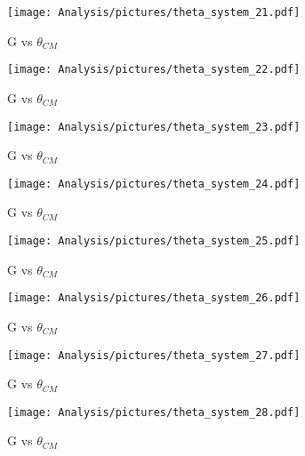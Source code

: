 \begin{figure}[htb]
  \begin{center}
    \texttt{[image: Analysis/pictures/theta\_system\_21.pdf]} \\
    \caption{G vs $\theta_{CM}$ }
    \label{fig:Gvstheta_W22}
  \end{center}
\end{figure}
\begin{figure}[htb]
  \begin{center}
    \texttt{[image: Analysis/pictures/theta\_system\_22.pdf]} \\
    \caption{G vs $\theta_{CM}$ }
    \label{fig:Gvstheta_W23}
  \end{center}
\end{figure}
\begin{figure}[htb]
  \begin{center}
    \texttt{[image: Analysis/pictures/theta\_system\_23.pdf]} \\
    \caption{G vs $\theta_{CM}$ }
    \label{fig:Gvstheta_W24}
  \end{center}
\end{figure}
\begin{figure}[htb]
  \begin{center}
    \texttt{[image: Analysis/pictures/theta\_system\_24.pdf]} \\
    \caption{G vs $\theta_{CM}$ }
    \label{fig:Gvstheta_W25}
  \end{center}
\end{figure}
\begin{figure}[htb]
  \begin{center}
    \texttt{[image: Analysis/pictures/theta\_system\_25.pdf]} \\
    \caption{G vs $\theta_{CM}$}
    \label{fig:Gvstheta_W26}
  \end{center}
\end{figure}
\begin{figure}[htb]
  \begin{center}
    \texttt{[image: Analysis/pictures/theta\_system\_26.pdf]} \\
    \caption{G vs $\theta_{CM}$ }
    \label{fig:Gvstheta_W27}
  \end{center}
\end{figure}
\begin{figure}[htb]
  \begin{center}
    \texttt{[image: Analysis/pictures/theta\_system\_27.pdf]} \\
    \caption{G vs $\theta_{CM}$ }
    \label{fig:Gvstheta_W28}
  \end{center}
\end{figure}
\begin{figure}[htb]
  \begin{center}
    \texttt{[image: Analysis/pictures/theta\_system\_28.pdf]} \\
    \caption{G vs $\theta_{CM}$ }
    \label{fig:Gvstheta_W29}
  \end{center}
\end{figure}
